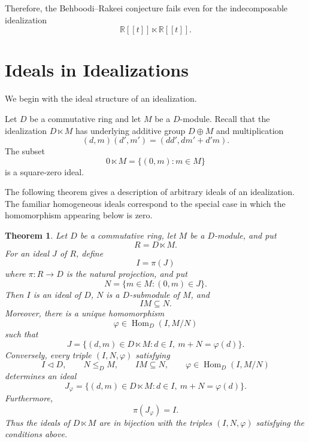 \documentclass[11pt]{article}
\newtheorem{theorem}{Theorem}[section]
\theoremstyle{definition}
\theoremstyle{remark}
\newcommand{\Hom}{\operatorname{Hom}}
\begin{document}
Therefore, the Behboodi--Rakeei conjecture fails even for the
indecomposable idealization
\[
\mathbb R[[t]]\ltimes\mathbb R[[t]].
\]

	
	\section{Ideals in Idealizations}
	
	We begin with the ideal structure of an idealization.
	
	Let $D$ be a commutative ring and let $M$ be a $D$-module. Recall that
	the idealization $D\ltimes M$ has underlying additive group
	$D\oplus M$ and multiplication
	\[
	(d,m)(d',m')=(dd',dm'+d'm).
	\]
	The subset
	\[
	0\ltimes M=\{(0,m):m\in M\}
	\]
	is a square-zero ideal.
	
	The following theorem gives a description of arbitrary ideals of an
	idealization. The familiar homogeneous ideals correspond to the
	special case in which the homomorphism appearing below is zero.
	
	\begin{theorem}
		\label{thm:classification}
		Let $D$ be a commutative ring, let $M$ be a $D$-module, and put
		\[
		R=D\ltimes M.
		\]
		For an ideal $J$ of $R$, define
		\[
		I=\pi(J)
		\]
		where $\pi:R\to D$ is the natural projection, and put
		\[
		N=\{m\in M:(0,m)\in J\}.
		\]
		Then $I$ is an ideal of $D$, $N$ is a $D$-submodule of $M$, and
		\[
		IM\subseteq N.
		\]
		Moreover, there is a unique homomorphism
		\[
		\varphi\in\Hom_D(I,M/N)
		\]
		such that
		\[
		J
		=
		\{(d,m)\in D\ltimes M:
		d\in I,\ m+N=\varphi(d)\}.
		\]
		Conversely, every triple $(I,N,\varphi)$ satisfying
		\[
		I\lhd D,\qquad N\leq_D M,\qquad IM\subseteq N,
		\qquad
		\varphi\in\Hom_D(I,M/N)
		\]
		determines an ideal
		\[
		J_\varphi
		=
		\{(d,m)\in D\ltimes M:
		d\in I,\ m+N=\varphi(d)\}.
		\]
		Furthermore,
		\[
		\pi(J_\varphi)=I.
		\]
		Thus the ideals of $D\ltimes M$ are in bijection with the triples
		$(I,N,\varphi)$ satisfying the conditions above.
	\end{theorem}
	
\end{document}
